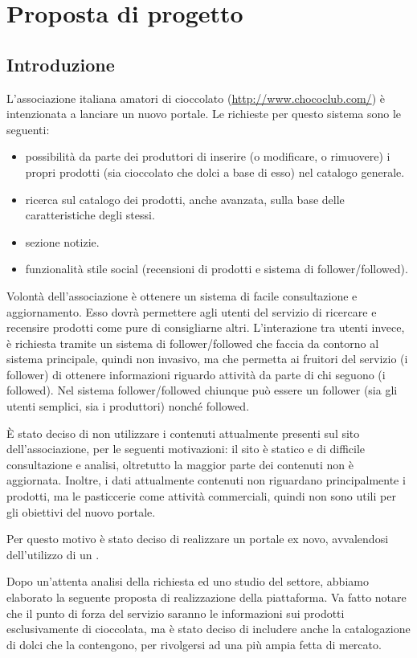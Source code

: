 \chapter{Proposta di progetto}

\section{Introduzione}
L’associazione italiana amatori di cioccolato (\url{http://www.chococlub.com/}) è intenzionata a lanciare un nuovo portale. 
Le richieste per questo sistema sono le seguenti:
\begin{itemize}
	\item possibilità da parte dei produttori di inserire (o modificare, o rimuovere) i propri prodotti (sia cioccolato che dolci a base di esso) nel catalogo generale.
	\item ricerca sul catalogo dei prodotti, anche avanzata, sulla base delle caratteristiche degli stessi.
	\item sezione notizie.
	\item funzionalità stile social (recensioni di prodotti e sistema di follower/follo\-wed).
\end{itemize}
Volontà dell'associazione è ottenere un sistema di facile consultazione e aggiornamento.
Esso dovrà permettere agli utenti del servizio di ricercare e recensire prodotti come pure di consigliarne altri.
L'interazione tra utenti invece, è richiesta tramite un sistema di follower/followed che faccia da contorno al sistema principale, quindi non invasivo, ma che permetta ai fruitori del servizio (i follower) di ottenere informazioni riguardo attività da parte di chi seguono (i followed).
Nel sistema follower/followed chiunque può essere un follower (sia gli utenti semplici, sia i produttori) nonché followed.
 
È stato deciso di non utilizzare i contenuti attualmente presenti sul sito dell’associazione, per le seguenti motivazioni: il sito è statico e di difficile consultazione e analisi, oltretutto la maggior parte dei contenuti non è aggiornata. Inoltre, i dati attualmente contenuti non riguardano principalmente i prodotti, ma le pasticcerie come attività commerciali, quindi non sono utili per gli obiettivi del nuovo portale.
 
Per questo motivo è stato deciso di realizzare un portale ex novo, avvalendosi dell’utilizzo di un .

Dopo un’attenta analisi della richiesta ed uno studio del settore, abbiamo elaborato la seguente proposta di realizzazione della piattaforma. Va fatto notare che il punto di forza del servizio saranno le informazioni sui prodotti esclusivamente di cioccolata, ma è stato deciso di includere anche la catalogazione di dolci che la contengono, per rivolgersi ad una più ampia fetta di mercato.

